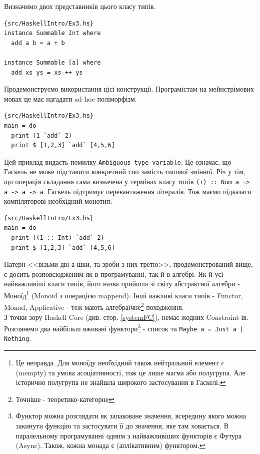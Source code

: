 \documentclass[12pt]{article}
\begin{document}
Визначимо двох представників цього класу типів.\\

\begin{lstlisting}{src/HaskellIntro/Ex3.hs}
instance Summable Int where
  add a b = a + b

instance Summable [a] where
  add xs ys = xs ++ ys
\end{lstlisting}

Продемонструємо використання цієї конструкції. Програмістам на мейнстрімових мовах це має нагадати ad-hoc поліморфізм.\\

\begin{lstlisting}{src/HaskellIntro/Ex3.hs}
main = do
  print (1 `add` 2)
  print $ [1,2,3] `add` [4,5,6]
\end{lstlisting}

Цей приклад видасть помилку \lstinline{Ambiguous type variable}. Це означає, що Гаскель не може підставити 
конкретний тип замість типової змінної. Річ у тім, що операція складання сама визначена у термінах класу 
типів \lstinline{(+) :: Num a => a -> a -> a}. Гаскель підтримує перевантаження літералів. Тож маємо 
підказати компіляторові необхідний монотип:\\

\begin{lstlisting}{src/HaskellIntro/Ex3.hs}
main = do
  print ((1 :: Int) `add` 2)
  print $ [1,2,3] `add` [4,5,6]
\end{lstlisting}

Патерн <<візьми дві а-шки, та зроби з них третю>>, продемонстрований вище, є досить розповсюдженим як в 
програмуванні, так й в алгебрі. Як й усі найважливіші класи типів, його назва прийшла зі світу 
абстрактної алгебри - Моноїд\footnote{Це неправда. Для моноїду необхідний також нейтральний елемент $\epsilon$ (mempty) та умова асоціативності, 
тож це лише магма або полугрупа. Але історично полугрупа не знайшла широкого застосування в Гаскелі.} (Monoid з операцією mappend). 
Інші важливі класи типів - Functor, Monad, Applicative - теж мають алгебраїчне\footnote{Точніше - теоретико-категорне} 
походження.\\

З точки зору Haskell Core (див. стор. \ref{systemFC}), немає жодних Constraint-ів. Розглянемо два найбільш вживані функтори\footnote{Функтор можна розглядати як запаковане значення, всередину якого можна закинути функцію та застосувати її до значення, яке там ховається. В паралельному програмуванні одним з найважливіших функторів є Футура (Async). Також, кожна монада є (аплікативним) функтором.} - список та \lstinline{Maybe a = Just a | Nothing}.
\end{document}
